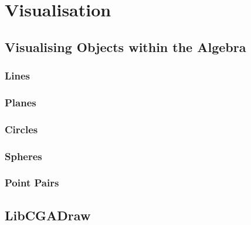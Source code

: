 \chapter{Visualisation}

\section{Visualising Objects within the Algebra}
\subsection{Lines}
\subsection{Planes}
\subsection{Circles}
\subsection{Spheres}
\subsection{Point Pairs}

\section{LibCGADraw}
